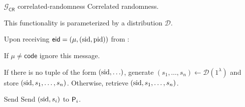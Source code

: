 \begin{cccFunctionality}
    {$\mathcal{G}_{\mathsf{CR}}$}
    {correlated-randomness}
	{Correlated randomness.}

    This functionality is parameterized by a distribution $\mathcal{D}$.

	\begin{cccItemize}[noitemsep]
		\item Upon receiving $\mathsf{eid} = (\mu, (\mathrm{sid}, \mathrm{pid}))$ from \party:
		\begin{cccEnum}[nosep]
			\item If $\mu \neq \mathsf{code}$ ignore this message.

			\item If there is no tuple of the form $(\mathrm{sid}, \ldots)$, generate $(s_1, \ldots, s_n) \gets \mathcal{D}(1^\lambda)$ and store $(\mathrm{sid}, s_1, \ldots, s_n)$. Otherwise, retrieve $(\mathrm{sid}, s_1, \ldots, s_n)$.

			\item Send Send $(\mathrm{sid}, s_i)$ to $\mathsf{P}_i$.
		\end{cccEnum}
	\end{cccItemize}
\end{cccFunctionality}